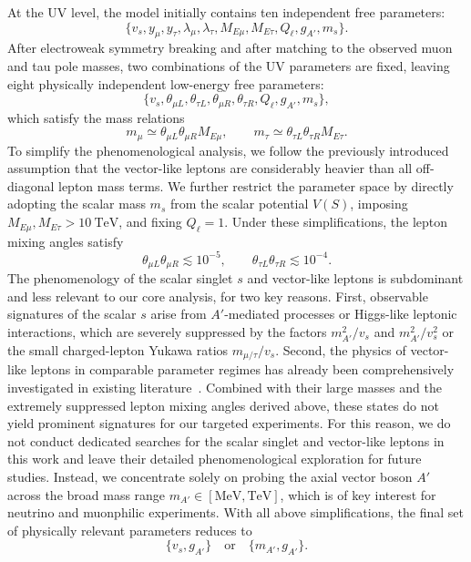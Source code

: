 \documentclass[onecolumn, aps, nofootinbib, prd, preprint, floats, floatfix, amsmath, amssymb, superscriptaddress, preprintnumbers]{revtex4-1}
\begin{document}
At the UV level, the model initially contains ten independent free parameters:
\begin{equation}
    \{v_s, y_\mu, y_\tau, \lambda_\mu,\lambda_\tau, M_{E\mu}, M_{E\tau}, Q_\ell, g_{A'}, m_s \}.
    \end{equation}
After electroweak symmetry breaking and after matching to the observed muon and tau pole masses, two combinations of the UV parameters are fixed, leaving eight physically independent low-energy free parameters:
\begin{equation}
    \{v_s, \theta_{\mu L}, \theta_{\tau L}, \theta_{\mu R},\theta_{\tau R}, Q_\ell, g_{A'}, m_s \},
    \end{equation}
which satisfy the mass relations
\begin{equation}
    m_\mu\simeq \theta_{\mu L} \theta_{\mu R} M_{E\mu}, \qquad
    m_\tau\simeq \theta_{\tau L} \theta_{\tau R} M_{E\tau}.
    \end{equation}
To simplify the phenomenological analysis, we follow the previously introduced assumption that the vector-like leptons are considerably heavier than all off-diagonal lepton mass terms. We further restrict the parameter space by directly adopting the scalar mass $m_s$ from the scalar potential $V(S)$, imposing $M_{E\mu},M_{E\tau} > 10~\mathrm{TeV}$, and fixing $Q_\ell=1$. Under these simplifications, the lepton mixing angles satisfy
\begin{equation}
    \theta_{\mu L}\theta_{\mu R}\lesssim 10^{-5}, \qquad
    \theta_{\tau L}\theta_{\tau R}\lesssim 10^{-4}.
    \end{equation}
The phenomenology of the scalar singlet $s$ and vector-like leptons is subdominant and less relevant to our core analysis, for two key reasons. First, observable signatures of the scalar $s$ arise from $A'$-mediated processes or Higgs-like leptonic interactions, which are severely suppressed by the factors $m_{A'}^2/v_s$ and $m_{A'}^2/v_s^2$ or the small charged-lepton Yukawa ratios $m_{\mu/\tau}/v_s$. Second, the physics of vector-like leptons in comparable parameter regimes has already been comprehensively investigated in existing literature~\cite{Cao:2023smj,Yue:2026tbc,Yue:2025xvk,Yue:2024sds}. Combined with their large masses and the extremely suppressed lepton mixing angles derived above, these states do not yield prominent signatures for our targeted experiments. For this reason, we do not conduct dedicated searches for the scalar singlet and vector-like leptons in this work and leave their detailed phenomenological exploration for future studies. Instead, we concentrate solely on probing the axial vector boson $A'$ across the broad mass range $m_{A'}\in [\mathrm{MeV}, \mathrm{TeV}]$, which is of key interest for neutrino and muonphilic experiments. With all above simplifications, the final set of physically relevant parameters reduces to
\begin{equation}
    \{v_s, g_{A'}\} \quad \text{or} \quad \{m_{A'}, g_{A'}\}.
\end{equation}
\end{document}
